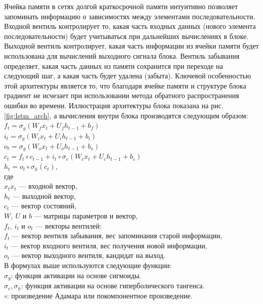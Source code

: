 Ячейка памяти в сетях долгой краткосрочной памяти интуитивно позволяет запоминать информацию о зависимостях между элементами последовательности. Входной вентиль контролирует то, какая часть входных данных (нового элемента последовательности) будет учитываться при дальнейших вычислениях в блоке. Выходной вентиль контролирует, какая часть информации из ячейки памяти будет использована для вычислений выходного сигнала блока. Вентиль забывания определяет, какая часть данных из памяти сохранится при переходе на следующий шаг, а какая часть будет удалена (забыта). Ключевой особенностью этой архитектуры является то, что благодаря ячейке памяти и структуре блока градиент не исчезает при использовании метода обратного распространения ошибки во времени. Иллюстрация архитектуры блока показана на рис. \ref{fig:lstm_arch}, а вычисления внутри блока производятся следующим образом:\\
$f_t = \sigma_g(W_{f} x_t + U_{f} h_{t-1} + b_f)$ \\
$i_t = \sigma_g(W_{i} x_t + U_{i} h_{t-1} + b_i)$ \\
$o_t = \sigma_g(W_{o} x_t + U_{o} h_{t-1} + b_o)$ \\
$c_t = f_t \circ c_{t-1} + i_t \circ \sigma_c(W_{c} x_t + U_{c} h_{t-1} + b_c)$ \\
$h_t = o_t \circ \sigma_h(c_t),$ \\
где \\
$x_{t}x_t$ — входной вектор,\\
$h_{t}$ — выходной вектор,\\
$c_{t}$ — вектор состояний,\\
$W,\ U$ и $b$ — матрицы параметров и вектор,\\
$f_{t},\ i_{t}$ и $o_{t}$ — векторы вентилей:\\
$f_{t}$ — вектор вентиля забывания, вес запоминания старой информации,\\
$i_{t}$ — вектор входного вентиля, вес получения новой информации,\\
$o_{t}$ — вектор выходного вентиля, кандидат на выход.\\
В формулах выше используются следующие функции: \\
$\sigma_{g}$: функция активации на основе сигмоиды.\\
$\sigma_{c}, \sigma_{h}$: функция активации на основе гиперболического тангенса.\\
$\circ$: произведение Адамара или покомпонентное произведение.

